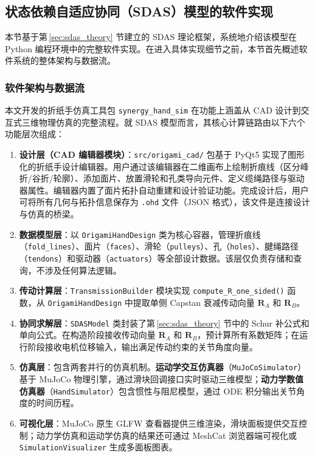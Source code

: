 
\subsection{状态依赖自适应协同（SDAS）模型的软件实现}
\label{sec:sdas_implementation}

本节基于第\,\ref{sec:sdas_theory} 节建立的 SDAS 理论框架，系统地介绍该模型在 Python 编程环境中的完整软件实现。在进入具体实现细节之前，本节首先概述软件系统的整体架构与数据流。

\subsubsection{软件架构与数据流}
\label{sec:architecture}

本文开发的折纸手仿真工具包 \verb|synergy_hand_sim| 在功能上涵盖从 CAD 设计到交互式三维物理仿真的完整流程。就 SDAS 模型而言，其核心计算链路由以下六个功能层次组成：

\begin{enumerate}
    \item \textbf{设计层（CAD 编辑器模块）}：\verb|src/origami_cad/| 包基于 PyQt5 实现了图形化的折纸手设计编辑器。用户通过该编辑器在二维画布上绘制折痕线（区分峰折/谷折/轮廓）、添加面片、放置滑轮和孔类导向元件、定义缆绳路径与驱动器属性。编辑器内置了面片拓扑自动重建和设计验证功能。完成设计后，用户可将所有几何与拓扑信息保存为 \verb|.ohd| 文件（JSON 格式），该文件是连接设计与仿真的桥梁。
    \item \textbf{数据模型层}：以 \verb|OrigamiHandDesign| 类为核心容器，管理折痕线（\verb|fold_lines|）、面片（\verb|faces|）、滑轮（\verb|pulleys|）、孔（\verb|holes|）、腱绳路径（\verb|tendons|）和驱动器（\verb|actuators|）等全部设计数据。该层仅负责存储和查询，不涉及任何算法逻辑。
    \item \textbf{传动计算层}：\verb|TransmissionBuilder| 模块实现 \verb|compute_R_one_sided()| 函数，从 \verb|OrigamiHandDesign| 中提取单侧 Capstan 衰减传动向量 $\mathbf{R}_A$ 和 $\mathbf{R}_B$。
    \item \textbf{协同求解层}：\verb|SDASModel| 类封装了第\,\ref{sec:sdas_theory} 节中的 Schur 补公式和单向公式。在构造阶段接收传动向量 $\mathbf{R}_A$ 和 $\mathbf{R}_B$，预计算所有系数矩阵；在运行阶段接收电机位移输入，输出满足传动约束的关节角度向量。
    \item \textbf{仿真层}：包含两套并行的仿真机制。\textbf{运动学交互仿真器}（\verb|MuJoCoSimulator|）基于 MuJoCo 物理引擎，通过滑块回调接口实时驱动三维模型；\textbf{动力学数值仿真器}（\verb|HandSimulator|）包含惯性与阻尼模型，通过 ODE 积分输出关节角度的时间历程。
    \item \textbf{可视化层}：MuJoCo 原生 GLFW 查看器提供三维渲染，滑块面板提供交互控制；动力学仿真和运动学仿真的结果还可通过 MeshCat 浏览器端可视化或 \verb|SimulationVisualizer| 生成多面板图表。
\end{enumerate}

